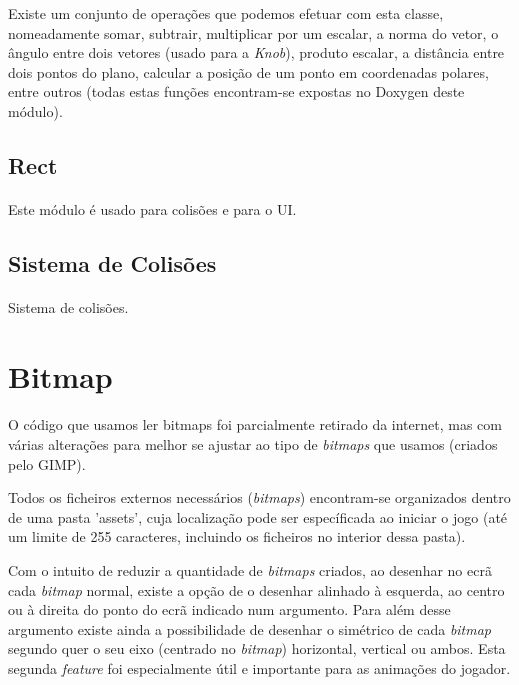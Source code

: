 \documentclass{report}
\begin{document}
Existe um conjunto de operações que podemos efetuar com esta classe, nomeadamente somar, subtrair, multiplicar por um escalar, a norma do vetor, o ângulo entre dois vetores (usado para a \textit{Knob}), produto escalar, a distância entre dois pontos do plano, calcular a posição de um ponto em coordenadas polares, entre outros (todas estas funções encontram-se expostas no Doxygen deste módulo).

\subsection{Rect}

\paragraph{}
Este módulo é usado para colisões e para o UI. 

\subsection{Sistema de Colisões}

\paragraph{}
Sistema de colisões.

\section{Bitmap}

\paragraph{}
O código que usamos ler bitmaps foi parcialmente retirado da internet, mas com várias alterações para melhor se ajustar ao tipo de \textit{bitmaps} que usamos (criados pelo GIMP).

Todos os ficheiros externos necessários (\textit{bitmaps}) encontram-se organizados dentro de uma pasta 'assets', cuja localização pode ser específicada ao iniciar o jogo (até um limite de 255 caracteres, incluindo os ficheiros no interior dessa pasta).

Com o intuito de reduzir a quantidade de \textit{bitmaps} criados, ao desenhar no ecrã cada \textit{bitmap} normal, existe a opção de o desenhar alinhado à esquerda, ao centro ou à direita do ponto do ecrã indicado num argumento. Para além desse argumento existe ainda a possibilidade de desenhar o simétrico de cada \textit{bitmap} segundo quer o seu eixo (centrado no \textit{bitmap}) horizontal, vertical ou ambos. Esta segunda \textit{feature} foi especialmente útil e importante para as animações do jogador. 
\end{document}

